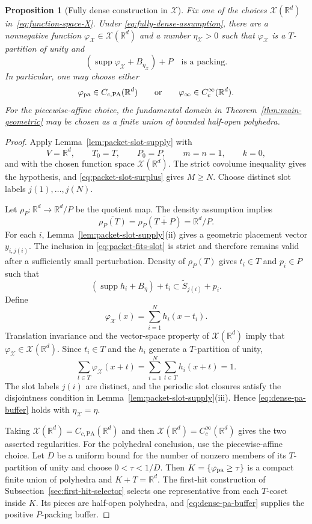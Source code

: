 \documentclass[11pt,reqno]{amsart}
\numberwithin{equation}{section}
\newtheorem{proposition}[theorem]{Proposition}
\theoremstyle{definition}
\theoremstyle{remark}
\newcommand{\R}{\mathbb R}
\newcommand{\supp}{\operatorname{supp}}
\begin{document}
\begin{proposition}[Fully dense construction in $\mathcal X$]
\label{prop:fully-dense-pa}
Fix one of the choices $\mathcal X(\R^d)$ in~\eqref{eq:function-space-X}.
Under
\eqref{eq:fully-dense-assumption}, there are a nonnegative function
$\varphi_{\mathcal X}\in\mathcal X(\R^d)$ and a number
$\eta_{\mathcal X}>0$ such that $\varphi_{\mathcal X}$ is a
$T$-partition of unity and
\begin{equation}\label{eq:dense-pa-buffer}
 (\supp\varphi_{\mathcal X}+B_{\eta_{\mathcal X}})+P
 \quad\text{is a packing.}
\end{equation}
In particular, one may choose either
\[
 \varphi_{\rm pa}\in C_{c,\mathrm{PA}}(\R^d)
 \qquad\text{or}\qquad
 \varphi_\infty\in C_c^\infty(\R^d).
\]
For the piecewise-affine choice, the fundamental domain in
Theorem~\ref{thm:main-geometric} may be chosen as a finite union of bounded
half-open polyhedra.
\end{proposition}

\begin{proof}
Apply Lemma~\ref{lem:packet-slot-supply} with
\[
 V=\R^d,
 \qquad T_0=T,
 \qquad P_0=P,
 \qquad m=n=1,
 \qquad k=0,
\]
and with the chosen function space $\mathcal X(\R^d)$.  The strict
covolume inequality gives the hypothesis, and
\eqref{eq:packet-slot-surplus} gives $M\ge N$.  Choose distinct slot labels
$j(1),\ldots,j(N)$.

Let $\rho_P:\R^d\to\R^d/P$ be the quotient map.  The density assumption
implies
\[
 \overline{\rho_P(T)}
 =\rho_P(\overline{T+P})
 =\R^d/P.
\]
For each $i$, Lemma~\ref{lem:packet-slot-supply}(ii) gives a geometric
placement vector $y_{i,j(i)}$.  The inclusion in
\eqref{eq:packet-fits-slot} is strict and therefore remains valid after a
sufficiently small perturbation.  Density of $\rho_P(T)$ gives
$t_i\in T$ and $p_i\in P$ such that
\[
 (\supp h_i+B_\eta)+t_i
 \subset \widetilde S_{j(i)}+p_i.
\]
Define
\[
 \varphi_{\mathcal X}(x)=\sum_{i=1}^N h_i(x-t_i).
\]
Translation invariance and the vector-space property of
$\mathcal X(\R^d)$ imply that
$\varphi_{\mathcal X}\in\mathcal X(\R^d)$.  Since $t_i\in T$ and the
$h_i$ generate a $T$-partition of unity,
\[
 \sum_{t\in T}\varphi_{\mathcal X}(x+t)
 =\sum_{i=1}^N\sum_{t\in T}h_i(x+t)=1.
\]
The slot labels $j(i)$ are distinct, and the periodic slot closures satisfy
the disjointness condition in Lemma~\ref{lem:packet-slot-supply}(iii).
Hence \eqref{eq:dense-pa-buffer} holds with
$\eta_{\mathcal X}=\eta$.

Taking $\mathcal X(\R^d)=C_{c,\mathrm{PA}}(\R^d)$ and then
$\mathcal X(\R^d)=C_c^\infty(\R^d)$ gives the two asserted regularities.
For the polyhedral conclusion, use the piecewise-affine choice.  Let $D$ be
a uniform bound for the number of nonzero members of its $T$-partition of
unity and choose $0<\tau<1/D$.  Then
$K=\{\varphi_{\rm pa}\ge\tau\}$ is a compact finite union of polyhedra and
$K+T=\R^d$.  The first-hit construction of
Subsection~\ref{sec:first-hit-selector} selects one representative from each
$T$-coset inside $K$.  Its pieces are half-open polyhedra, and
\eqref{eq:dense-pa-buffer} supplies the positive $P$-packing buffer.
\end{proof}
\end{document}
